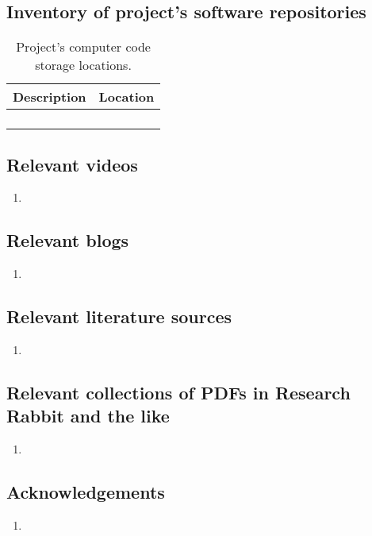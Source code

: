 \documentclass[10pt,letterpaper]{article}
\newcommand{\be}{\begin{enumerate}}
\newcommand{\ee}{\end{enumerate}}
\begin{document}
\subsection*{Inventory of project's software repositories}


\begin{table}
    \centering
    \begin{tabular}{cc}
        Description & Location\\
        \toprule
         & \\
         & \\
         & \\
         & \\
         \bottomrule
    \end{tabular}
    \caption{Project's computer code storage locations.}
    \label{tab:my_label}
\end{table}



\subsection*{Relevant videos}

\be
\item 
\ee

\subsection*{Relevant blogs}

\be
\item 
\ee


\subsection*{Relevant literature sources}

\be
\item 
\ee

\subsection*{Relevant collections of PDFs in Research Rabbit and the like}

\be
\item 
\ee


\subsection*{Acknowledgements}
% 
\be
\item 
\ee
\end{document}
